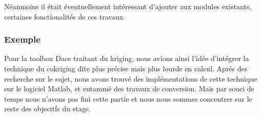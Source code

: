Néanmoins il était éventuellement intéressant d’ajouter aux modules existants,
certaines fonctionalités de ces travaux.

\subsubsection*{Exemple}
Pour la toolbox Dace traitant du kriging, nous avions ainsi l’idée d'intégrer
la technique du cokriging dite plus précise mais plus lourde en calcul. Aprés des
recherche sur le sujet, nous avons trouvé des implémentations de cette technique
sur le logiciel Matlab, et entammé des travaux de conversion.
Mais par souci de temps nous n'avons pas fini cette partie et nous nous sommes concentrer
sur le reste des objecitfs du stage.

